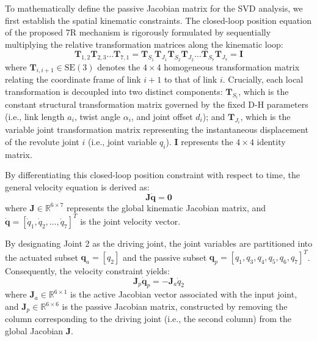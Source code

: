 \documentclass[a4paper,fleqn]{cas-sc}
\begin{document}
To mathematically define the passive Jacobian matrix for the SVD analysis, we first establish the spatial kinematic constraints. The closed-loop position equation of the proposed 7R mechanism is rigorously formulated by sequentially multiplying the relative transformation matrices along the kinematic loop:
\begin{equation}
    \mathbf{T}_{1,2} \mathbf{T}_{2,3} \dots \mathbf{T}_{7,1} = \mathbf{T}_{S_1} \mathbf{T}_{J_1} \mathbf{T}_{S_2} \mathbf{T}_{J_2} \dots \mathbf{T}_{S_7} \mathbf{T}_{J_7} = \mathbf{I}
\end{equation}
where $\mathbf{T}_{i,i+1} \in \mathrm{SE}(3)$ denotes the $4 \times 4$ homogeneous transformation matrix relating the coordinate frame of link $i+1$ to that of link $i$. Crucially, each local transformation is decoupled into two distinct components: $\mathbf{T}_{S_i}$, which is the constant structural transformation matrix governed by the fixed D-H parameters (i.e., link length $a_i$, twist angle $\alpha_i$, and joint offset $d_i$); and $\mathbf{T}_{J_i}$, which is the variable joint transformation matrix representing the instantaneous displacement of the revolute joint $i$ (i.e., joint variable $q_i$). $\mathbf{I}$ represents the $4 \times 4$ identity matrix.

By differentiating this closed-loop position constraint with respect to time, the general velocity equation is derived as:
\begin{equation}
    \mathbf{J} \dot{\mathbf{q}} = \mathbf{0}
\end{equation}
where $\mathbf{J} \in \mathbb{R}^{6 \times 7}$ represents the global kinematic Jacobian matrix, and $\dot{\mathbf{q}} = [\dot{q}_1, \dot{q}_2, \dots, \dot{q}_7]^T$ is the joint velocity vector. 

By designating Joint 2 as the driving joint, the joint variables are partitioned into the actuated subset $\mathbf{q}_a = [q_2]$ and the passive subset $\mathbf{q}_p = [q_1, q_3, q_4, q_5, q_6, q_7]^T$. Consequently, the velocity constraint yields:
\begin{equation}
    \mathbf{J}_p \dot{\mathbf{q}}_p = - \mathbf{J}_a \dot{q}_2
\end{equation}
where $\mathbf{J}_a \in \mathbb{R}^{6 \times 1}$ is the active Jacobian vector associated with the input joint, and $\mathbf{J}_p \in \mathbb{R}^{6 \times 6}$ is the passive Jacobian matrix, constructed by removing the column corresponding to the driving joint (i.e., the second column) from the global Jacobian $\mathbf{J}$.
\end{document}
